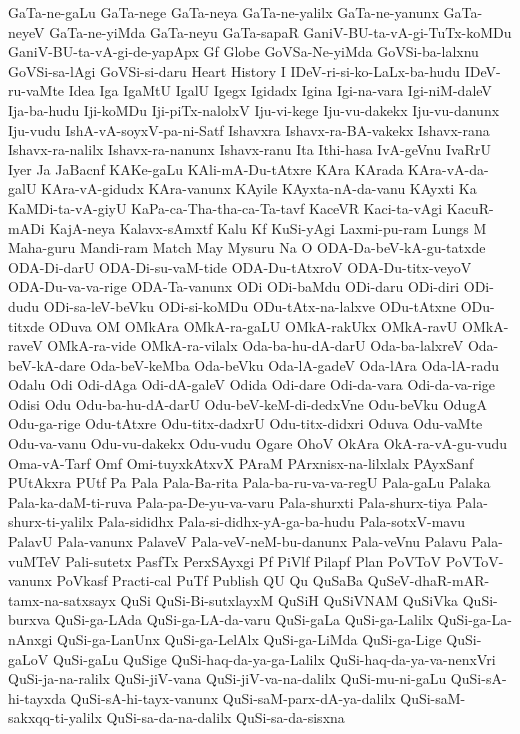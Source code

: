{GaTa-ne-gaLu
GaTa-nege
GaTa-neya
GaTa-ne-yalilx
GaTa-ne-yanunx
GaTa-neyeV
GaTa-ne-yiMda
GaTa-neyu
GaTa-sapaR
GaniV-BU-ta-vA-gi-TuTx-koMDu
GaniV-BU-ta-vA-gi-de-yapApx
Gf
Globe
GoVSa-Ne-yiMda
GoVSi-ba-lalxnu
GoVSi-sa-lAgi
GoVSi-si-daru
Heart
History
I
IDeV-ri-si-ko-LaLx-ba-hudu
IDeV-ru-vaMte
Idea
Iga
IgaMtU
IgalU
Igegx
Igidadx
Igina
Igi-na-vara
Igi-niM-daleV
Ija-ba-hudu
Iji-koMDu
Iji-piTx-nalolxV
Iju-vi-kege
Iju-vu-dakekx
Iju-vu-danunx
Iju-vudu
IshA-vA-soyxV-pa-ni-Satf
Ishavxra
Ishavx-ra-BA-vakekx
Ishavx-rana
Ishavx-ra-nalilx
Ishavx-ra-nanunx
Ishavx-ranu
Ita
Ithi-hasa
IvA-geVnu
IvaRrU
Iyer
Ja
JaBacnf
KAKe-gaLu
KAli-mA-Du-tAtxre
KAra
KArada
KAra-vA-da-galU
KAra-vA-gidudx
KAra-vanunx
KAyile
KAyxta-nA-da-vanu
KAyxti
Ka
KaMDi-ta-vA-giyU
KaPa-ca-Tha-tha-ca-Ta-tavf
KaceVR
Kaci-ta-vAgi
KacuR-mADi
KajA-neya
Kalavx-sAmxtf
Kalu
Kf
KuSi-yAgi
Laxmi-pu-ram
Lungs
M
Maha-guru
Mandi-ram
Match
May
Mysuru
Na
O
ODA-Da-beV-kA-gu-tatxde
ODA-Di-darU
ODA-Di-su-vaM-tide
ODA-Du-tAtxroV
ODA-Du-titx-veyoV
ODA-Du-va-va-rige
ODA-Ta-vanunx
ODi
ODi-baMdu
ODi-daru
ODi-diri
ODi-dudu
ODi-sa-leV-beVku
ODi-si-koMDu
ODu-tAtx-na-lalxve
ODu-tAtxne
ODu-titxde
ODuva
OM
OMkAra
OMkA-ra-gaLU
OMkA-rakUkx
OMkA-ravU
OMkA-raveV
OMkA-ra-vide
OMkA-ra-vilalx
Oda-ba-hu-dA-darU
Oda-ba-lalxreV
Oda-beV-kA-dare
Oda-beV-keMba
Oda-beVku
Oda-lA-gadeV
Oda-lAra
Oda-lA-radu
Odalu
Odi
Odi-dAga
Odi-dA-galeV
Odida
Odi-dare
Odi-da-vara
Odi-da-va-rige
Odisi
Odu
Odu-ba-hu-dA-darU
Odu-beV-keM-di-dedxVne
Odu-beVku
OdugA
Odu-ga-rige
Odu-tAtxre
Odu-titx-dadxrU
Odu-titx-didxri
Oduva
Odu-vaMte
Odu-va-vanu
Odu-vu-dakekx
Odu-vudu
Ogare
OhoV
OkAra
OkA-ra-vA-gu-vudu
Oma-vA-Tarf
Omf
Omi-tuyxkAtxvX
PAraM
PArxnisx-na-lilxlalx
PAyxSanf
PUtAkxra
PUtf
Pa
Pala
Pala-Ba-rita
Pala-ba-ru-va-va-regU
Pala-gaLu
Palaka
Pala-ka-daM-ti-ruva
Pala-pa-De-yu-va-varu
Pala-shurxti
Pala-shurx-tiya
Pala-shurx-ti-yalilx
Pala-sididhx
Pala-si-didhx-yA-ga-ba-hudu
Pala-sotxV-mavu
PalavU
Pala-vanunx
PalaveV
Pala-veV-neM-bu-danunx
Pala-veVnu
Palavu
Pala-vuMTeV
Pali-sutetx
PasfTx
PerxSAyxgi
Pf
PiVlf
Pilapf
Plan
PoVToV
PoVToV-vanunx
PoVkasf
Practi-cal
PuTf
Publish
QU
Qu
QuSaBa
QuSeV-dhaR-mAR-tamx-na-satxsayx
QuSi
QuSi-Bi-sutxlayxM
QuSiH
QuSiVNAM
QuSiVka
QuSi-burxva
QuSi-ga-LAda
QuSi-ga-LA-da-varu
QuSi-gaLa
QuSi-ga-Lalilx
QuSi-ga-La-nAnxgi
QuSi-ga-LanUnx
QuSi-ga-LelAlx
QuSi-ga-LiMda
QuSi-ga-Lige
QuSi-gaLoV
QuSi-gaLu
QuSige
QuSi-haq-da-ya-ga-Lalilx
QuSi-haq-da-ya-va-nenxVri
QuSi-ja-na-ralilx
QuSi-jiV-vana
QuSi-jiV-va-na-dalilx
QuSi-mu-ni-gaLu
QuSi-sA-hi-tayxda
QuSi-sA-hi-tayx-vanunx
QuSi-saM-parx-dA-ya-dalilx
QuSi-saM-sakxqq-ti-yalilx
QuSi-sa-da-na-dalilx
QuSi-sa-da-sisxna
}
